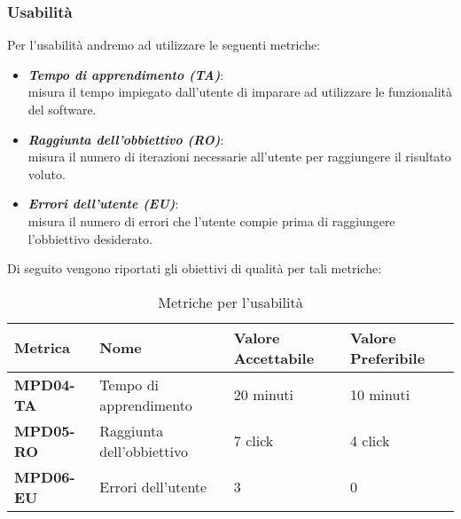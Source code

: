 \subsubsection{Usabilità}
Per l'usabilità andremo ad utilizzare le seguenti metriche:
\begin{itemize}
    \item \textbf{\emph{Tempo di apprendimento (TA)}}:\\
    misura il tempo impiegato dall'utente di imparare ad utilizzare le funzionalità del software.
    \item \textbf{\emph{Raggiunta dell'obbiettivo (RO)}}:\\
    misura il numero di iterazioni necessarie all'utente per raggiungere il risultato voluto.
    \item \textbf{\emph{Errori dell'utente (EU)}}:\\
    misura il numero di errori che l'utente compie prima di raggiungere l'obbiettivo desiderato.
\end{itemize}
Di seguito vengono riportati gli obiettivi di qualità per tali metriche:
\begin{table}[htbp]
    \centering
    \begin{tabular}{|>{\centering\arraybackslash}p{4cm}|p{4cm}|p{4cm}|p{4cm}|}
    \hline
    \rowcolor{gray!30}
    \textbf{Metrica} & \textbf{Nome} & \textbf{Valore Accettabile} & \textbf{Valore Preferibile} \\
    \hline
    \rowcolor{gray!10}
    \textbf{MPD04-TA} & Tempo di apprendimento & 20 minuti & 10 minuti \\
    \hline
    \rowcolor{gray!10}
    \textbf{MPD05-RO} & Raggiunta dell'obbiettivo & 7 click & 4 click \\
    \hline
    \rowcolor{gray!10}
    \textbf{MPD06-EU} & Errori dell'utente & 3 & 0 \\
    \hline
    \end{tabular}
    \caption{Metriche per l'usabilità}
    \label{tab:metriche_usabilita}
\end{table}
\newpage
